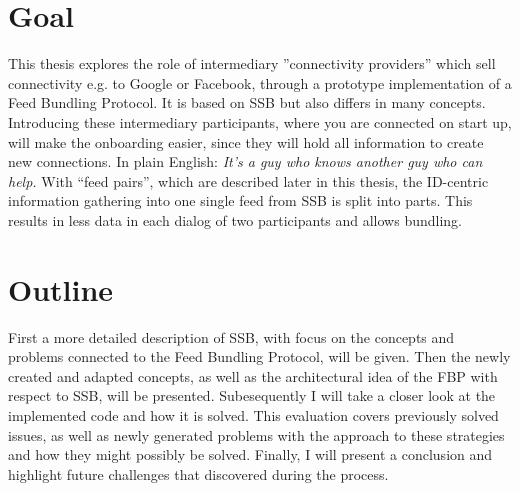 \section{Goal}
This thesis explores the role of intermediary ”connectivity providers” which sell connectivity e.g. to Google or Facebook, through a prototype implementation of a Feed Bundling Protocol. It is based on SSB but also differs in many concepts. Introducing these intermediary participants, where you are connected on start up, will make the onboarding easier, since they will hold all information to create new connections. In plain English: \textit{It’s a guy who knows another guy who can help.} With “feed pairs”, which are described later in this thesis, the ID-centric information gathering into one single feed from SSB is split into parts. This results in less data in each dialog of two participants and allows bundling. 

\section{Outline}
First a more detailed description of SSB, with focus on the concepts and problems connected to the Feed Bundling Protocol, will be given. Then the newly created and adapted concepts, as well as the architectural idea of the FBP with respect to SSB, will be presented. Subesequently I will take a closer look at the implemented code and how it is solved. This evaluation covers previously solved issues, as well as newly generated problems with the approach to these strategies and how they might possibly be solved. Finally, I will present a conclusion and highlight future challenges that discovered during the process. 

